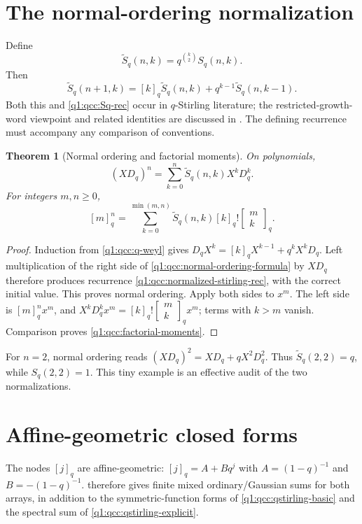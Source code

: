 \documentclass[11pt,a4paper,oneside,openany]{book}
\newtheorem{theorem}{Theorem}[chapter]
\theoremstyle{definition}
\theoremstyle{remark}
\newcommand{\GB}[3][q]{\begin{bmatrix}#2\\#3\end{bmatrix}_{#1}}
\begin{document}
\section{The normal-ordering normalization}
Define
\begin{equation}\label{q1:qcc:normalized-stirling}
 \widetilde S_q(n,k)=q^{\binom k2}S_q(n,k).
\end{equation}
Then
\begin{equation}\label{q1:qcc:normalized-stirling-rec}
 \widetilde S_q(n+1,k)=[k]_q\widetilde S_q(n,k)
                         +q^{k-1}\widetilde S_q(n,k-1).
\end{equation}
Both this and \eqref{q1:qcc:Sq-rec} occur in \(q\)-Stirling literature; the
restricted-growth-word viewpoint and related identities are discussed in
\cite{cai}. The defining recurrence must accompany any comparison of conventions.

\begin{theorem}[Normal ordering and factorial moments]\label{q1:qcc:normal-ordering}
On polynomials,
\begin{equation}\label{q1:qcc:normal-ordering-formula}
 (XD_q)^n=\sum_{k=0}^n\widetilde S_q(n,k)X^kD_q^k.
\end{equation}
For integers \(m,n\ge0\),
\begin{equation}\label{q1:qcc:factorial-moments}
 [m]_q^n=\sum_{k=0}^{\min(m,n)}
          \widetilde S_q(n,k)[k]_q!\GB mk.
\end{equation}
\end{theorem}
\begin{proof}
Induction from \eqref{q1:qcc:q-weyl} gives
\(D_qX^k=[k]_qX^{k-1}+q^kX^kD_q\).
Left multiplication of the right side of \eqref{q1:qcc:normal-ordering-formula}
by \(XD_q\) therefore produces recurrence
\eqref{q1:qcc:normalized-stirling-rec}, with the correct initial value.
This proves normal ordering.
Apply both sides to \(x^m\). The left side is \([m]_q^nx^m\), and
\(X^kD_q^kx^m=[k]_q!\GB mk x^m\); terms with \(k>m\) vanish.
Comparison proves \eqref{q1:qcc:factorial-moments}.
\end{proof}
For \(n=2\), normal ordering reads
\((XD_q)^2=XD_q+qX^2D_q^2\). Thus
\(\widetilde S_q(2,2)=q\), while \(S_q(2,2)=1\). This tiny example is an
effective audit of the two normalizations.

\section{Affine-geometric closed forms}
The nodes \([j]_q\) are affine-geometric: \([j]_q=A+Bq^j\) with
\(A=(1-q)^{-1}\) and \(B=-(1-q)^{-1}\).  therefore
gives finite mixed ordinary/Gaussian sums for both arrays, in addition to the
symmetric-function forms of \cref{q1:qcc:qstirling-basic} and the spectral
sum of \cref{q1:qcc:qstirling-explicit}.
\end{document}
